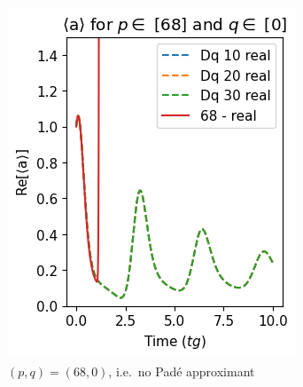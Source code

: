 \begin{figure}[h!]
    \centering
    \begin{subfigure}{0.32\linewidth}
        \centering
        \includegraphics[width=\linewidth]{Pics/Pade_68_0.pdf}
        \caption{$(p, q) = (68, 0)$, i.e.\@~no Padé approximant}
        \label{fig:Pade_68_0}
    \end{subfigure}
    \hfill
    \begin{subfigure}{0.32\linewidth}
        \centering

\end{subfigure}
\end{figure}
